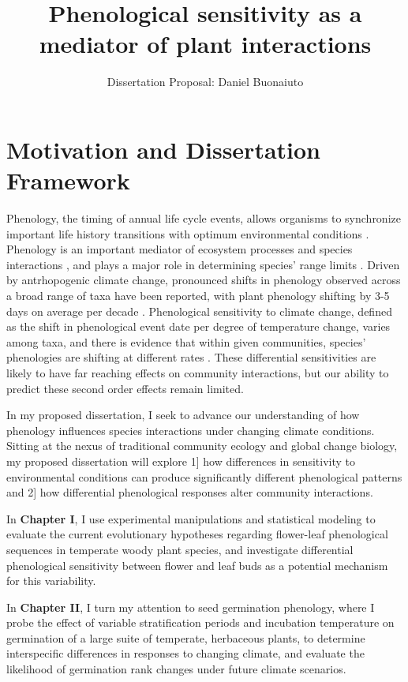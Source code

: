 \documentclass{article}\usepackage[]{graphicx}\usepackage[]{color}
\begin{document}
\title{Phenological sensitivity as a mediator of plant interactions}
\author{Dissertation Proposal: Daniel Buonaiuto}
\maketitle{}
\section*{Motivation and Dissertation Framework}
\indent\indent Phenology, the timing of annual life cycle events, allows organisms to synchronize important life history transitions with optimum environmental conditions \citep{Forrest2010}. Phenology is an important mediator of ecosystem processes \citep{Piao2007,Cleland2007} and species interactions \citep{Yang2010,Leverett2017}, and plays a major role in determining species' range limits \citep{Chuine2001}. Driven by antrhopogenic climate change, pronounced shifts in phenology observed across a broad range of taxa have been reported, with plant phenology shifting by 3-5 days on average per decade \citep{Parmesan2003,Menzel2006,Root2003}. Phenological sensitivity to climate change, defined as the shift in phenological event date per degree of temperature change, varies among taxa, and there is evidence that within given communities, species' phenologies are shifting at different rates \citep{Cleland2012,Ovaskainen2013}. These differential sensitivities are likely to have far reaching effects on community interactions, but our ability to predict these second order effects remain limited.
\par In my proposed dissertation, I seek to advance our understanding of how phenology influences species interactions under changing climate conditions. Sitting at the nexus of traditional community ecology and global change biology, my proposed dissertation will explore 1] how differences in sensitivity to environmental conditions can produce significantly different phenological patterns and 2] how differential phenological responses alter community interactions.
\par In \textbf{Chapter I}, I use experimental manipulations and statistical modeling to evaluate the current evolutionary hypotheses regarding flower-leaf phenological sequences in temperate woody plant species, and investigate differential phenological sensitivity between flower and leaf buds as a potential mechanism for this variability.
\par In \textbf{Chapter II}, I turn my attention to seed germination phenology, where I probe the effect of variable stratification periods and incubation temperature on germination of a large suite of temperate, herbaceous plants, to determine interspecific differences in responses to changing climate, and evaluate the likelihood of germination rank changes under future climate scenarios.
\end{document}

